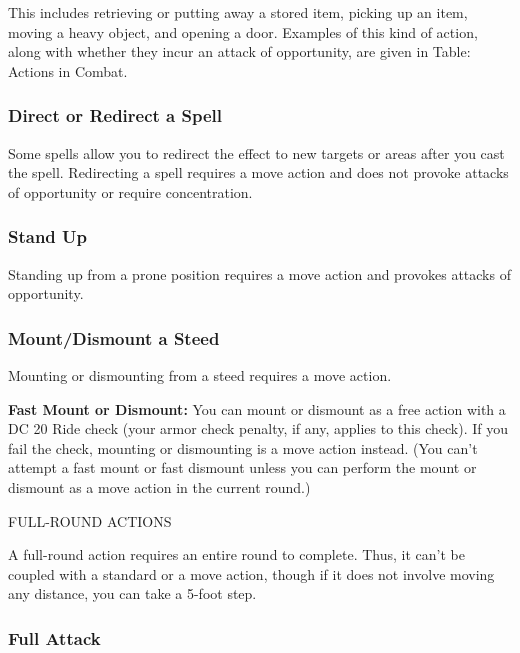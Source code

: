\documentclass{article}
\begin{document}
This includes retrieving or putting away a stored item, picking up an item, moving 
a heavy object, and opening a door. Examples of this kind of action, along with 
whether they incur an attack of opportunity, are given in Table: Actions in Combat.

\vspace{12pt}
\subsubsection*{\textbf{Direct or Redirect a Spell}}

Some spells\textit{ }allow you to redirect the effect to new targets or areas after 
you cast the spell. Redirecting a spell requires a move action and does not provoke 
attacks of opportunity or require concentration.

\vspace{12pt}
\subsubsection*{\textbf{Stand Up}}

Standing up from a prone position requires a move action and provokes attacks of 
opportunity.

\vspace{12pt}
\subsubsection*{\textbf{Mount/Dismount a Steed}}

Mounting or dismounting from a steed requires a move action.

\textbf{Fast Mount or Dismount:} You can mount or dismount as a free action with 
a DC 20 Ride check (your armor check penalty, if any, applies to this check). If 
you fail the check, mounting or dismounting is a move action instead. (You can't 
attempt a fast mount or fast dismount unless you can perform the mount or dismount 
as a move action in the current round.)

\vspace{12pt}
FULL-ROUND ACTIONS

A full-round action requires an entire round to complete. Thus, it can't be coupled 
with a standard or a move action, though if it does not involve moving any distance, 
you can take a 5-foot step.

\vspace{12pt}
\subsubsection*{\textbf{Full Attack}}
\end{document}
